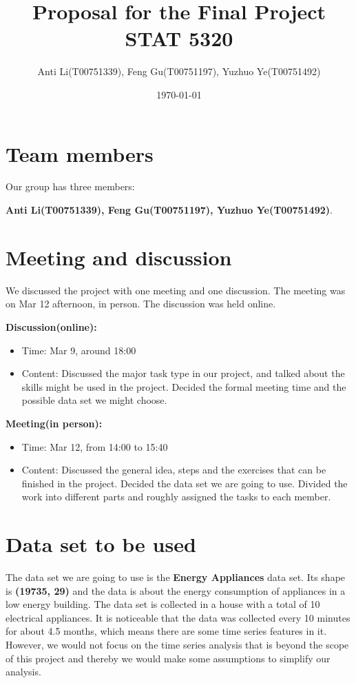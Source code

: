 \documentclass{article}
\title{Proposal for the Final Project STAT 5320}
\author{Anti Li(T00751339), Feng Gu(T00751197), Yuzhuo Ye(T00751492)}
\date{\today}
\begin{document}
\maketitle
\section{Team members}
Our group has three members:

\textbf{Anti Li(T00751339), Feng Gu(T00751197), Yuzhuo Ye(T00751492)}.

\section{Meeting and discussion}
We discussed the project with one meeting and one discussion. The meeting was on Mar 12 afternoon,
in person. The discussion was held online.

\textbf{Discussion(online):}
\begin{itemize}
    \item Time: Mar 9, around 18:00
    \item Content:
        Discussed the major task type in our project, and talked about the skills might be used in the project.
        Decided the formal meeting time and the possible data set we might choose.
\end{itemize}

\textbf{Meeting(in person):}
\begin{itemize}
    \item Time: Mar 12, from 14:00 to 15:40
    \item Content:
        Discussed the general idea, steps and the exercises that can be finished in the project. Decided the data set we are going to use.
        Divided the work into different parts and roughly assigned the tasks to each member.
\end{itemize}

\section{Data set to be used}
The data set we are going to use is the \textbf{Energy Appliances} data set. 
Its shape is \textbf{(19735, 29)} and the data is about the energy consumption of appliances in a low energy building.
The data set is collected in a house with a total of 10 electrical appliances. 
It is noticeable that the data was collected every 10 minutes for about 4.5 months,
which means there are some time series features in it. 
However, we would not focus on the time series analysis
that is beyond the scope of this project and thereby we would make some assumptions to simplify our analysis.
\end{document}
